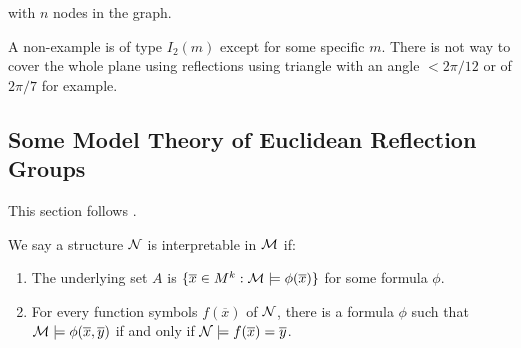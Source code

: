 \documentclass[../main.tex]{subfiles}
\begin{document}

with $n$ nodes in the graph.

A non-example is of type $I_2(m)$ except for some specific $m$. There is not way to cover the whole plane using reflections using triangle with an angle $<2\pi/12$ or of $2\pi/7$ for example.

\subsection{Some Model Theory of Euclidean Reflection Groups}


This section follows \cite{MuhlherrPaoliniShelah2022}.

\begin{definition}
    We say a structure $\mathcal{N}$ is interpretable in $\mathcal{M}$ if:\begin{enumerate}
        \item The underlying set $A$ is $\{\overline x \in M^k:\mathcal{M}\models \phi(\overline x)\}$ for some formula $\phi$.
        \item For every function symbols $f(\overline x)$ of $\mathcal{N}$, there is a formula $\phi$ such that $\mathcal{M} \models \phi(\overline x,\overline y)$ if and only if $\mathcal{N} \models f(\overline x)=\overline y$.
    \end{enumerate}
\end{definition}
\end{document}
